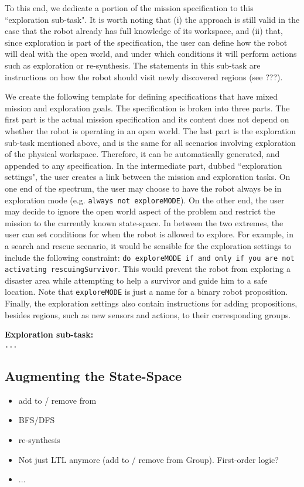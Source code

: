 To this end, we dedicate a portion of the mission specification to this ``exploration sub-task". It is worth noting that (i) the approach is still valid in the case that the robot already has full knowledge of its workspace, and (ii) that, since exploration is part of the specification, the user can define how the robot will deal with the open world, and under which conditions it will perform actions such as exploration or re-synthesis. The statements in this sub-task are instructions on how the robot should visit newly discovered regions (see ???).

We create the following template for defining specifications that have mixed mission and exploration goals. The specification is broken into three parts. The first part is the actual mission specification and its content does not depend on whether the robot is operating in an open world. The last part is the exploration sub-task mentioned above, and is the same for all scenarios involving exploration of the physical workspace. Therefore, it can be automatically generated, and appended to any specification. In the intermediate part, dubbed ``exploration settings", the user creates a link between the mission and exploration tasks. On one end of the spectrum, the user may choose to have the robot always be in exploration mode (e.g. \texttt{always not exploreMODE}). On the other end, the user may decide to ignore the open world aspect of the problem and restrict the mission to the currently known state-space. In between the two extremes, the user can set conditions for when the robot is allowed to explore. For example, in a search and rescue scenario, it would be sensible for the exploration settings to include the following constraint: \texttt{do exploreMODE if and only if you are not activating rescuingSurvivor}. This would prevent the robot from exploring a disaster area while attempting to help a survivor and guide him to a safe location. Note that \texttt{exploreMODE} is just a name for a binary robot proposition. Finally, the exploration settings also contain instructions for adding propositions, besides regions, such as new sensors and actions, to their corresponding groups.

\begin{algorithm}
	\textbf{Exploration sub-task:}\\
	{\small
	\texttt{...}
	}
\end{algorithm}

\subsection{Augmenting the State-Space} %

\begin{itemize}
	\item add to / remove from
	\item BFS/DFS
	\item re-synthesis
	\item Not just LTL anymore (add to / remove from Group). First-order logic?
	\item ...
\end{itemize}

